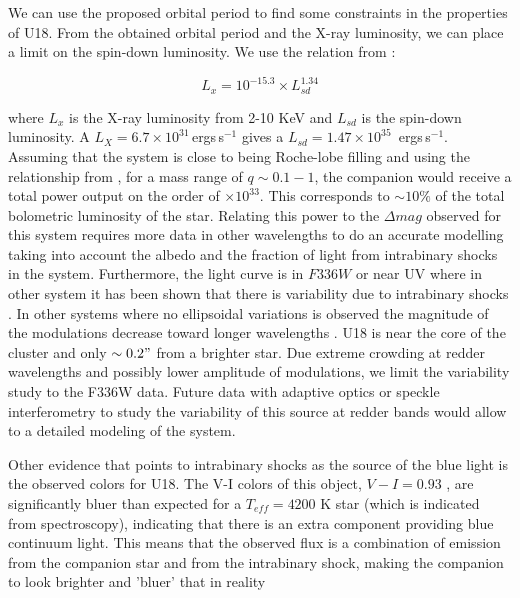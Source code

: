 \documentclass[fleqn,usenatbib,useAMS,letters]{mnras}
\newcommand{\ergs}{\,ergs\,s$^{-1}$} %
\begin{document}
 We can use the proposed orbital period to find some constraints in the properties of U18. From the obtained orbital period and the X-ray luminosity, we can place a limit on the spin-down luminosity. We use the relation from \cite{Possenti2002}:

 $$L_x = 10^{-15.3} \times L_{sd}^{1.34} $$
 
 where $L_x$ is the X-ray luminosity from 2-10 KeV and $L_{sd}$ is the spin-down luminosity. A $L_X= 6.7 \times 10 ^{31}$\ergs \citep[0.3-8 keV;][]{bogdanov_chandra_2010} gives a $L_{sd} = 1.47\times 10 ^{35}$ \ergs. Assuming that the system is close to being Roche-lobe filling and using the relationship from \cite{EggletonRoche1983}, for a mass range of $q\sim0.1-1$, the companion would receive a total power output on the order of $\times 10^{33}$. This corresponds to $\sim 10 \%$ of the total bolometric luminosity of the star. Relating this power to the $\Delta mag$ observed for this system requires more data in other wavelengths to do an accurate modelling taking into account the albedo and the fraction of light from intrabinary shocks in the system. Furthermore, the light curve is in $F336W$ or near UV where in other system it has been shown that there is variability due to intrabinary shocks \cite[e.g.][]{Liliana201847Tuc}. In other systems where no ellipsoidal variations is observed the magnitude of the modulations decrease toward longer wavelengths \cite[e.g.][]{Baglio2016}. U18 is near the core of the cluster and only $\sim 0.2"$ from a brighter star. Due extreme crowding at redder wavelengths and possibly lower amplitude of modulations, we limit the variability study to the F336W data. Future data with adaptive optics or speckle interferometry to study the variability of this source at redder bands would allow to a detailed modeling of the system. 
 
Other evidence that points to intrabinary shocks as the source of the blue light is the observed colors for U18. The V-I colors of this object, $V-I = 0.93$ \citep{Pallanca2017Halpha}, are significantly bluer than expected for a $T_{eff}=4200$ K star \citep{Mamajek2013} (which is indicated from spectroscopy), indicating that there is an extra component providing blue continuum light. This means that the observed flux is a combination of emission from the companion star and from the intrabinary shock, making the companion to look brighter and ’bluer’ that in reality
\end{document}
